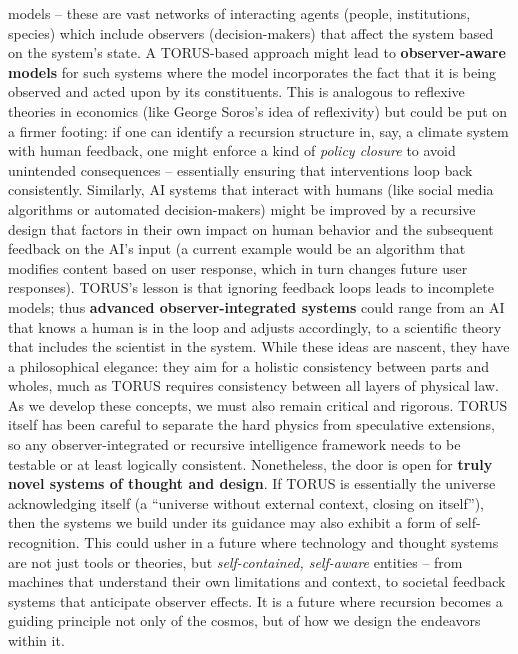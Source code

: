 \documentclass[]{article}
\begin{document}
\begin{itemize}
  models -- these are vast networks of interacting agents (people,
  institutions, species) which include observers (decision-makers) that
  affect the system based on the system's state. A TORUS-based approach
  might lead to \textbf{observer-aware models} for such systems where
  the model incorporates the fact that it is being observed and acted
  upon by its constituents. This is analogous to reflexive theories in
  economics (like George Soros's idea of reflexivity) but could be put
  on a firmer footing: if one can identify a recursion structure in,
  say, a climate system with human feedback, one might enforce a kind of
  \emph{policy closure} to avoid unintended consequences -- essentially
  ensuring that interventions loop back consistently. Similarly, AI
  systems that interact with humans (like social media algorithms or
  automated decision-makers) might be improved by a recursive design
  that factors in their own impact on human behavior and the subsequent
  feedback on the AI's input (a current example would be an algorithm
  that modifies content based on user response, which in turn changes
  future user responses). TORUS's lesson is that ignoring feedback loops
  leads to incomplete models; thus \textbf{advanced observer-integrated
  systems} could range from an AI that knows a human is in the loop and
  adjusts accordingly, to a scientific theory that includes the
  scientist in the system. While these ideas are nascent, they have a
  philosophical elegance: they aim for a holistic consistency between
  parts and wholes, much as TORUS requires consistency between all
  layers of physical law​. As we develop these concepts, we must also
  remain critical and rigorous. TORUS itself has been careful to
  separate the hard physics from speculative extensions​, so any
  observer-integrated or recursive intelligence framework needs to be
  testable or at least logically consistent. Nonetheless, the door is
  open for \textbf{truly novel systems of thought and design}. If TORUS
  is essentially the universe acknowledging itself (a ``universe without
  external context, closing on itself''​), then the systems we build
  under its guidance may also exhibit a form of self-recognition. This
  could usher in a future where technology and thought systems are not
  just tools or theories, but \emph{self-contained, self-aware} entities
  -- from machines that understand their own limitations and context, to
  societal feedback systems that anticipate observer effects. It is a
  future where recursion becomes a guiding principle not only of the
  cosmos, but of how we design the endeavors within it.
\end{itemize}
\end{document}
